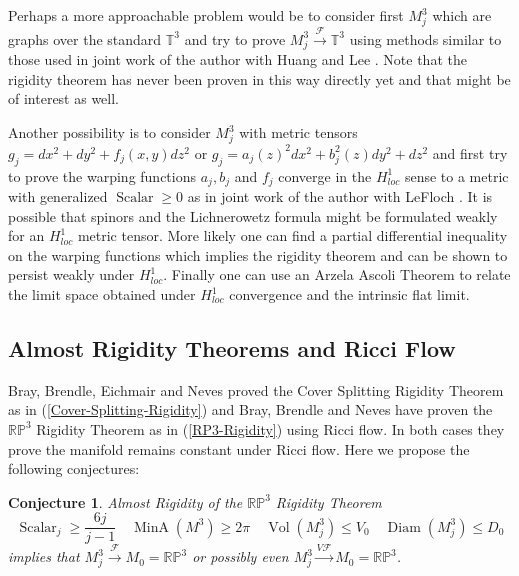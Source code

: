 \documentclass[12pt]{amsart}
\newtheorem{conj}[thm]{Conjecture}
\begin{document}
Perhaps a more approachable problem would be to consider first $M^3_j$
which are graphs over the standard ${\mathbb{T}}^3$ and try to prove
$M^3_j {\stackrel {\mathcal{F}}{\longrightarrow} } {\mathbb{T}}^3$ using methods similar to those used in joint work
of the author with Huang and Lee \cite{HLS}.   Note that the rigidity theorem
has never been proven in this way directly yet and that might be of interest
as well.

Another possibility is to consider $M_j^3$ with metric tensors $g_j=dx^2+dy^2 +f_j(x,y) dz^2$ or $g_j=a_j(z)^2dx^2+b_j^2(z)dy^2 + dz^2$ and first try to prove
the warping functions $a_j, b_j$ and $f_j$ converge in the $H^1_{loc}$ sense 
to a metric with generalized ${\operatorname{Scalar}}\ge 0$ as in joint work of the 
author with LeFloch \cite{LeFloch-Sormani-1}.  It is possible that spinors and
the Lichnerowetz formula might be formulated weakly for an $H^1_{loc}$
metric tensor.  More likely one can find a partial differential inequality 
on the warping functions which implies the rigidity theorem and can be shown 
to persist weakly under $H^1_{loc}$.  Finally one can use an Arzela Ascoli Theorem to relate the limit space obtained under $H^1_{loc}$ convergence and the
intrinsic flat limit.

\subsection{Almost Rigidity Theorems and Ricci Flow}

Bray, Brendle, Eichmair and Neves proved the
Cover Splitting
Rigidity Theorem as in (\ref{Cover-Splitting-Rigidity}) and
Bray, Brendle and Neves have proven the
$\mathbb{RP}^3$ Rigidity
Theorem as in (\ref{RP3-Rigidity}) using Ricci flow.  In both cases they
prove the manifold remains constant under Ricci flow.  Here we propose
the following conjectures:

\begin{conj} Almost Rigidity of the ${\mathbb{RP}}^3$ Rigidity Theorem
\begin{equation}
{\operatorname{Scalar}}_j \ge \frac{6j}{j-1} \quad {\operatorname{MinA}}(M^3)\ge 2\pi \quad
{\operatorname{Vol}}(M_j^3)\le V_0 \quad {\operatorname{Diam}}(M_j^3)\le D_0
\end{equation}
implies that $M_{j}^3 {\stackrel {\mathcal{F}}{\longrightarrow} } M_0=\mathbb{RP}^3$ or 
possibly even $M_{j}^3 {\stackrel {V\mathcal{F}}{\longrightarrow} } M_0=\mathbb{RP}^3$.
\end{conj}
\end{document}
